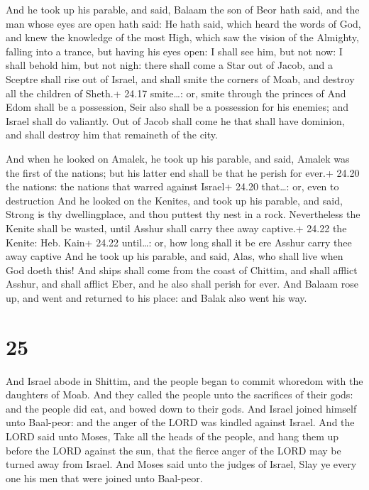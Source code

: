  And he took up his parable, and said, Balaam the son of
Beor hath said, and the man whose eyes are open hath said: 
He hath said, which heard the words of God, and knew the knowledge of
the most High, which saw the vision of the Almighty, falling into a
trance, but having his eyes open:  I shall see him, but not
now: I shall behold him, but not nigh: there shall come a Star out of
Jacob, and a Sceptre shall rise out of Israel, and shall smite the
corners of Moab, and destroy all the children of Sheth.+ 24.17
smite\ldots: or, smite through the princes of  And Edom
shall be a possession, Seir also shall be a possession for his enemies;
and Israel shall do valiantly.  Out of Jacob shall come he
that shall have dominion, and shall destroy him that remaineth of the
city.

 And when he looked on Amalek, he took up his parable,
and said, Amalek was the first of the nations; but his latter end shall
be that he perish for ever.+ 24.20 the nations: the nations that warred
against Israel+ 24.20 that\ldots: or, even to destruction 
And he looked on the Kenites, and took up his parable, and said, Strong
is thy dwellingplace, and thou puttest thy nest in a rock. 
Nevertheless the Kenite shall be wasted, until Asshur shall carry thee
away captive.+ 24.22 the Kenite: Heb. Kain+ 24.22 until\ldots: or, how
long shall it be ere Asshur carry thee away captive  And he
took up his parable, and said, Alas, who shall live when God doeth this!
 And ships shall come from the coast of Chittim, and shall
afflict Asshur, and shall afflict Eber, and he also shall perish for
ever.  And Balaam rose up, and went and returned to his
place: and Balak also went his way.

\hypertarget{section-24}{%
\section{25}\label{section-24}}

 And Israel abode in Shittim, and the people began to commit
whoredom with the daughters of Moab.  And they called the
people unto the sacrifices of their gods: and the people did eat, and
bowed down to their gods.  And Israel joined himself unto
Baal-peor: and the anger of the LORD was kindled against Israel.
 And the LORD said unto Moses, Take all the heads of the
people, and hang them up before the LORD against the sun, that the
fierce anger of the LORD may be turned away from Israel. 
And Moses said unto the judges of Israel, Slay ye every one his men that
were joined unto Baal-peor.

